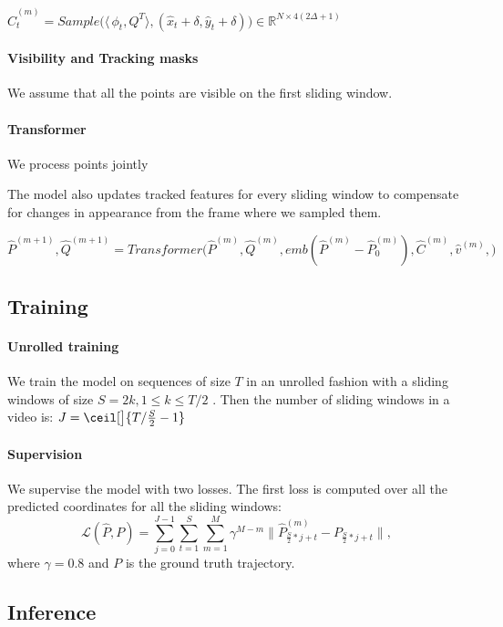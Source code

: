 $\hat{C}^{(m)}_{t} = Sample\big (\langle\,\phi_t, Q^T \rangle, (\hat x_t + \delta, \hat y_t + \delta)\big ) \in \mathbb{R}^{N \times  4(2\Delta+1)}   $ 

\paragraph{Visibility and Tracking masks}
We assume that all the points are visible on the first sliding window. 

\paragraph{Transformer}
We process points jointly

The model also updates tracked features for every sliding window to compensate for changes in appearance from the frame where we sampled them.

$\hat P^{(m+1)}, \hat Q^{(m+1)} = Transformer\big (\hat P^{(m)}, \hat Q^{(m)}, emb(\hat P^{(m)}-\hat P^{(m)}_0), \hat{C}^{(m)}, \hat v^{(m)}, \big )$


\subsection{Training}
\paragraph{Unrolled training}
We train the model on sequences of size $T$ in an unrolled fashion with a sliding windows of size $S = 2k, 1 \leq k \leq T/2 $ .
Then the number of sliding windows in a video is: $J = \ceil[\big]{T/\frac{S}{2} - 1}$

\paragraph{Supervision}
We supervise the model with two losses. The first loss is computed over all the predicted coordinates for all the sliding windows:
\begin{equation}
    \mathcal{L}(\hat{P}, P) = \sum_{j=0}^{J-1} {\sum_{t=1}^{S} { \sum_{m=1}^{M} \gamma^{M-m} \|\hat{P}_{\frac{S}{2}*j+t}^{(m)}  - P_{\frac{S}{2}*j+t}\|}},
  \label{eq:also-important}
\end{equation}
where $\gamma=0.8$ and $P$ is the ground truth trajectory. 



\subsection{Inference}